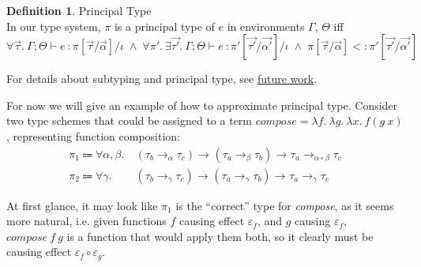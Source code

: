 \documentclass[declaration,shortabstract]{iithesis}
\theoremstyle{definition} \newtheorem{definition}{Definition}[section]
\newcommand{\types}[4][\Gamma;\Theta]{\ensuremath{{{#1} \vdash {#2} \: : {#3}/{#4}}}}
\newcommand{\arrow}[3]{{#1}\rightarrow_{#2}{#3}}
\newcommand{\lam}[1][x]{\ensuremath{\lambda #1.\:}}
\begin{document}
\theoremstyle{definition}
\begin{definition}{Principal Type}
\\
In our type system, $\pi$ is a principal type of $e$ in environments $\Gamma$, $\Theta$ iff
$$ \forall \vec{\tau}. \: \types{e}{\pi[\vec{\tau} / \vec{\alpha}]}{\iota} \;\wedge\;
    \forall \pi'.\:\exists \vec{\tau'}.\: \types{e}{\pi'[\vec{\tau'} / \vec{\alpha'}]}{\iota} \;\wedge\; 
    \pi[\vec{\tau} / \vec{\alpha}] <: \pi'[\vec{\tau'} / \vec{\alpha'}]
$$
\end{definition}
For details about subtyping and principal type, see \hyperlink{chapter.6}{future work}.

For now we will give an example of how to approximate principal type.
Consider two type schemes that could be assigned to a term $\textit{compose} = \lam[f]\lam[g]\lam f (g\:x) $, representing function composition:
\begin{align*}
    \pi_1\Coloneqq  \forall\alpha,\beta. &\:
    \arrow{(\arrow{\tau_b}{\alpha}{\tau_c})}{}{
        \arrow{(\arrow{\tau_a}{\beta}{\tau_b})}{}{
                \arrow{\tau_a}{\alpha \circ \beta}{\tau_c}}} 
    \\
    \pi_2\Coloneqq  \forall\gamma      . &\:
    \arrow{(\arrow{\tau_b}{\gamma}{\tau_c})}{}{
        \arrow{(\arrow{\tau_a}{\gamma}{\tau_b})}{}{
                \arrow{\tau_a}{\gamma}{\tau_c}}} 
\end{align*}

At first glance, it may look like $\pi_1$ is the ``correct'' type for \textit{compose}, as it seems more natural,
 i.e. given functions $f$ causing effect $\varepsilon_f$, and $g$ causing $\varepsilon_f$, $\textit{compose}\:f\:g$
is a function that would apply them both, so it clearly must be causing effect $\varepsilon_f \circ \varepsilon_g$.
\end{document}
